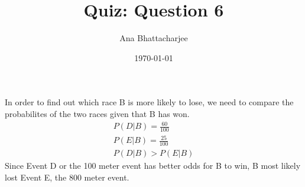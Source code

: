 \documentclass{article}
\begin{document}
\title{Quiz: Question 6}
\author{Ana Bhattacharjee}
\date{\today}
\maketitle

\begin{center}
  In order to find out which race B is more likely to lose, we need to compare the probabilites of the two races given that B has won.
  \begin{align}
    P(D | B) = \frac{60}{100} \\
    P(E | B) = \frac{25}{100} \\
    P(D | B) > P(E | B)
  \end{align}
  Since Event D or the 100 meter event has better odds for B to win, B most likely lost Event E, the 800 meter event. 
\end{center}
\end{document}
